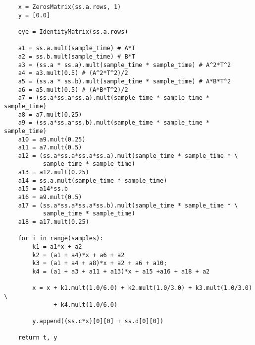 \begin{verbatim}
    x = ZerosMatrix(ss.a.rows, 1)
    y = [0.0]
    
    eye = IdentityMatrix(ss.a.rows)
    
    a1 = ss.a.mult(sample_time) # A*T
    a2 = ss.b.mult(sample_time) # B*T
    a3 = (ss.a * ss.a).mult(sample_time * sample_time) # A^2*T^2
    a4 = a3.mult(0.5) # (A^2*T^2)/2
    a5 = (ss.a * ss.b).mult(sample_time * sample_time) # A*B*T^2
    a6 = a5.mult(0.5) # (A*B*T^2)/2
    a7 = (ss.a*ss.a*ss.a).mult(sample_time * sample_time * sample_time)
    a8 = a7.mult(0.25)
    a9 = (ss.a*ss.a*ss.b).mult(sample_time * sample_time * sample_time)
    a10 = a9.mult(0.25)
    a11 = a7.mult(0.5)
    a12 = (ss.a*ss.a*ss.a*ss.a).mult(sample_time * sample_time * \
           sample_time * sample_time)
    a13 = a12.mult(0.25)
    a14 = ss.a.mult(sample_time * sample_time)
    a15 = a14*ss.b
    a16 = a9.mult(0.5)
    a17 = (ss.a*ss.a*ss.a*ss.b).mult(sample_time * sample_time * \
           sample_time * sample_time)
    a18 = a17.mult(0.25)
    
    for i in range(samples):
        k1 = a1*x + a2
        k2 = (a1 + a4)*x + a6 + a2
        k3 = (a1 + a4 + a8)*x + a2 + a6 + a10;
        k4 = (a1 + a3 + a11 + a13)*x + a15 +a16 + a18 + a2
        
        x = x + k1.mult(1.0/6.0) + k2.mult(1.0/3.0) + k3.mult(1.0/3.0) \
              + k4.mult(1.0/6.0)
        
        y.append((ss.c*x)[0][0] + ss.d[0][0])

    return t, y\end{verbatim}

